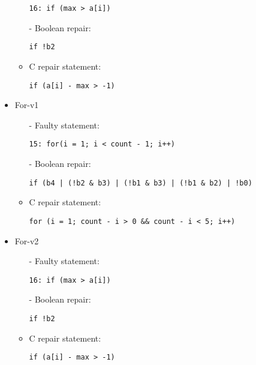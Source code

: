 \begin{itemize}
\begin{itemize}
\lstinline|16: if (max > a[i])|
\item[-] Boolean repair:

\lstinline{if !b2}
\item[-] C repair statement: 

\lstinline|if (a[i] - max > -1)|
\end{itemize}

\item For-v1
\begin{itemize}
\item[-] Faulty statement:

\lstinline|15: for(i = 1; i < count - 1; i++)|
\item[-] Boolean repair:

\lstinline{if (b4 | (!b2 & b3) | (!b1 & b3) | (!b1 & b2) | !b0)}
\item[-] C repair statement: 

\lstinline|for (i = 1; count - i > 0 && count - i < 5; i++)|
\end{itemize}

\item For-v2
\begin{itemize}
\item[-] Faulty statement:

\lstinline|16: if (max > a[i])|
\item[-] Boolean repair:

\lstinline{if !b2}
\item[-] C repair statement: 

\lstinline|if (a[i] - max > -1)|
\end{itemize}

\end{itemize}
